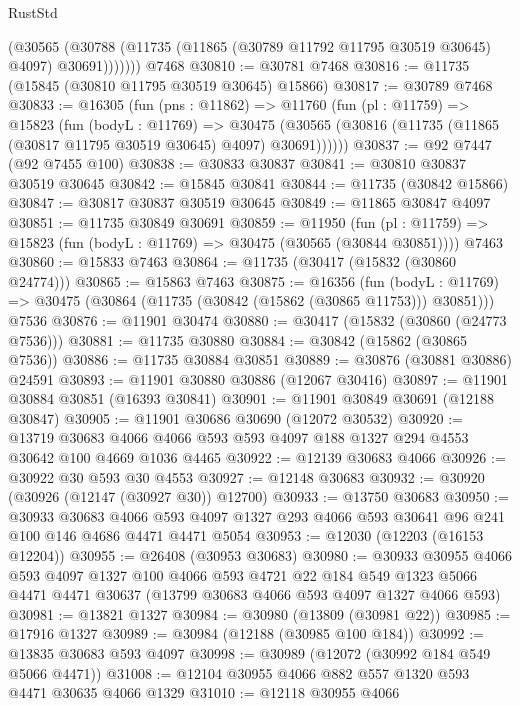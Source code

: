 \begin{lexlean}{RustStd}
\begin{coremodule}
            (@30565
              (@30788 (@11735 (@11865 (@30789 @11792 @11795 @30519 @30645) @4097) @30691)))))))
    @7468
@30810 := @30781 @7468
@30816 := @11735 (@15845 (@30810 @11795 @30519 @30645) @15866)
@30817 := @30789 @7468
@30833 := @16305
    (fun (pns : @11862) =>
    @11760
      (fun (pl : @11759) =>
      @15823
        (fun (bodyL : @11769) =>
        @30475 (@30565 (@30816 (@11735 (@11865 (@30817 @11795 @30519 @30645) @4097) @30691))))))
@30837 := @92 @7447 (@92 @7455 @100)
@30838 := @30833 @30837
@30841 := @30810 @30837 @30519 @30645
@30842 := @15845 @30841
@30844 := @11735 (@30842 @15866)
@30847 := @30817 @30837 @30519 @30645
@30849 := @11865 @30847 @4097
@30851 := @11735 @30849 @30691
@30859 := @11950
    (fun (pl : @11759) => @15823 (fun (bodyL : @11769) => @30475 (@30565 (@30844 @30851))))
    @7463
@30860 := @15833 @7463
@30864 := @11735 (@30417 (@15832 (@30860 @24774)))
@30865 := @15863 @7463
@30875 := @16356
    (fun (bodyL : @11769) => @30475 (@30864 (@11735 (@30842 (@15862 (@30865 @11753))) @30851)))
    @7536
@30876 := @11901 @30474
@30880 := @30417 (@15832 (@30860 (@24773 @7536)))
@30881 := @11735 @30880
@30884 := @30842 (@15862 (@30865 @7536))
@30886 := @11735 @30884 @30851
@30889 := @30876 (@30881 @30886) @24591
@30893 := @11901 @30880 @30886 (@12067 @30416)
@30897 := @11901 @30884 @30851 (@16393 @30841)
@30901 := @11901 @30849 @30691 (@12188 @30847)
@30905 := @11901 @30686 @30690 (@12072 @30532)
@30920 := @13719
    @30683
    @4066
    @4066
    @593
    @593
    @4097
    @188
    @1327
    @294
    @4553
    @30642
    @100
    @4669
    @1036
    @4465
@30922 := @12139 @30683 @4066
@30926 := @30922 @30 @593 @30 @4553
@30927 := @12148 @30683
@30932 := @30920 (@30926 (@12147 (@30927 @30)) @12700)
@30933 := @13750 @30683
@30950 := @30933
    @30683
    @4066
    @593
    @4097
    @1327
    @293
    @4066
    @593
    @30641
    @96
    @241
    @100
    @146
    @4686
    @4471
    @4471
    @5054
@30953 := @12030 (@12203 (@16153 @12204))
@30955 := @26408 (@30953 @30683)
@30980 := @30933
    @30955
    @4066
    @593
    @4097
    @1327
    @100
    @4066
    @593
    @4721
    @22
    @184
    @549
    @1323
    @5066
    @4471
    @4471
    @30637
    (@13799 @30683 @4066 @593 @4097 @1327 @4066 @593)
@30981 := @13821 @1327
@30984 := @30980 (@13809 (@30981 @22))
@30985 := @17916 @1327
@30989 := @30984 (@12188 (@30985 @100 @184))
@30992 := @13835 @30683 @593 @4097
@30998 := @30989 (@12072 (@30992 @184 @549 @5066 @4471))
@31008 := @12104 @30955 @4066 @882 @557 @1320 @593 @4471 @30635 @4066 @1329
@31010 := @12118 @30955 @4066

\end{coremodule}
\end{lexlean}

